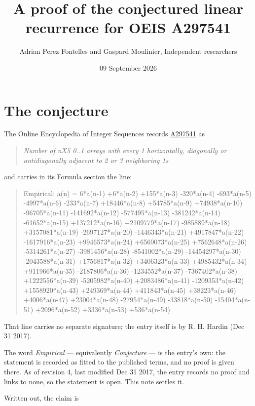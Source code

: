 \documentclass[11pt]{article}
\title{A proof of the conjectured linear recurrence for OEIS A297541}
\author{Adrian Perez Fontelles and Gaspard Moulinier, Independent researchers}
\date{09 September 2026}
\theoremstyle{definition}
\begin{document}
\maketitle
\section{The conjecture}

The Online Encyclopedia of Integer Sequences records \href{https://oeis.org/A297541}{A297541} as

\begin{quote}\itshape Number of nX5 0..1 arrays with every 1 horizontally, diagonally or antidiagonally adjacent to 2 or 3 neighboring 1s\end{quote}

and carries in its Formula section the line:

\begin{quote}\ttfamily Empirical: a(n) = 6*a(n-1) +6*a(n-2) +155*a(n-3) -320*a(n-4) -693*a(n-5) -4997*a(n-6) -233*a(n-7) +18446*a(n-8) +54785*a(n-9) +74938*a(n-10) -96705*a(n-11) -141692*a(n-12) -577495*a(n-13) -381242*a(n-14) -61652*a(n-15) +137212*a(n-16) +2109779*a(n-17) -985889*a(n-18) +3157081*a(n-19) -2697127*a(n-20) -1446343*a(n-21) +4917847*a(n-22) -1617916*a(n-23) +9946573*a(n-24) +6569073*a(n-25) +7562648*a(n-26) -5314261*a(n-27) -3981456*a(n-28) -8541002*a(n-29) -14454297*a(n-30) -2043588*a(n-31) +1756817*a(n-32) +3406323*a(n-33) +4985432*a(n-34) +911966*a(n-35) -2187806*a(n-36) -1234552*a(n-37) -7367402*a(n-38) +1222556*a(n-39) -5205982*a(n-40) +2083486*a(n-41) -1209353*a(n-42) +1558920*a(n-43) +249369*a(n-44) +411843*a(n-45) +38223*a(n-46) +4006*a(n-47) +23004*a(n-48) -27954*a(n-49) -33818*a(n-50) -15404*a(n-51) +2096*a(n-52) +3336*a(n-53) +536*a(n-54)\end{quote}

That line carries no separate signature; the entry itself is by R. H. Hardin (Dec 31 2017).

The word {\itshape Empirical} --- equivalently {\itshape Conjecture} --- is the entry's own: the statement is recorded as fitted to the published terms, and no proof is given there. As of revision 4, last modified Dec 31 2017, the entry records no proof and links to none, so the statement is open. This note settles it.

Written out, the claim is
\end{document}
